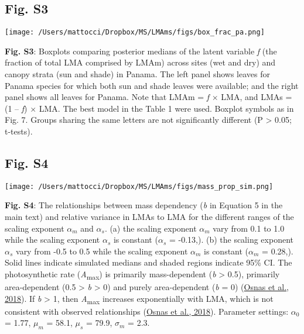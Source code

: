 \documentclass[
  12pt,
  letterpaper,
  DIV=11,
  numbers=noendperiod]{scrartcl}
\begin{document}
\newpage

\hypertarget{fig.-s3}{%
\subsection{Fig. S3}\label{fig.-s3}}

\texttt{[image: /Users/mattocci/Dropbox/MS/LMAms/figs/box\_frac\_pa.png]}

\textbf{Fig. S3}: Boxplots comparing posterior medians of the latent
variable \emph{f} (the fraction of total LMA comprised by LMAm) across
sites (wet and dry) and canopy strata (sun and shade) in Panama. The
left panel shows leaves for Panama species for which both sun and shade
leaves were available; and the right panel shows all leaves for Panama.
Note that LMAm = \emph{f} \(\times\) LMA, and LMAs = (1 -- \emph{f})
\(\times\) LMA. The best model in the Table 1 were used. Boxplot symbols
as in Fig. 7. Groups sharing the same letters are not significantly
different (P \textgreater{} 0.05; t-tests).

\newpage

\hypertarget{fig.-s4}{%
\subsection{Fig. S4}\label{fig.-s4}}

\texttt{[image: /Users/mattocci/Dropbox/MS/LMAms/figs/mass\_prop\_sim.png]}

\textbf{Fig. S4}: The relationships between mass dependency (\emph{b} in
Equation 5 in the main text) and relative variance in LMAs to LMA for
the different ranges of the scaling exponent \(\alpha_m\) and
\(\alpha_s\). (a) the scaling exponent \(\alpha_m\) vary from 0.1 to 1.0
while the scaling exponent \(\alpha_s\) is constant (\(\alpha_s\) =
-0.13,). (b) the scaling exponent \(\alpha_s\) vary from -0.5 to 0.5
while the scaling exponent \(\alpha_m\) is constant (\(\alpha_m\) =
0.28,). Solid lines indicate simulated medians and shaded regions
indicate 95\% CI. The photosynthetic rate (\emph{A}\textsubscript{max})
is primarily mass-dependent (\emph{b} \textgreater{} 0.5), primarily
area-dependent (0.5 \textgreater{} \emph{b} \textgreater{} 0) and purely
area-dependent (\emph{b} = 0) (\protect\hyperlink{ref-Osnas2018}{Osnas
et al., 2018}). If \emph{b} \textgreater{} 1, then
\emph{A}\textsubscript{max} increases exponentially with LMA, which is
not consistent with observed relationships
(\protect\hyperlink{ref-Osnas2018}{Osnas et al., 2018}). Parameter
settings: \(\alpha_0\) = 1.77, \(\mu_m\) = 58.1, \(\mu_s\) = 79.9,
\(\sigma_m\) = 2.3.
\end{document}
